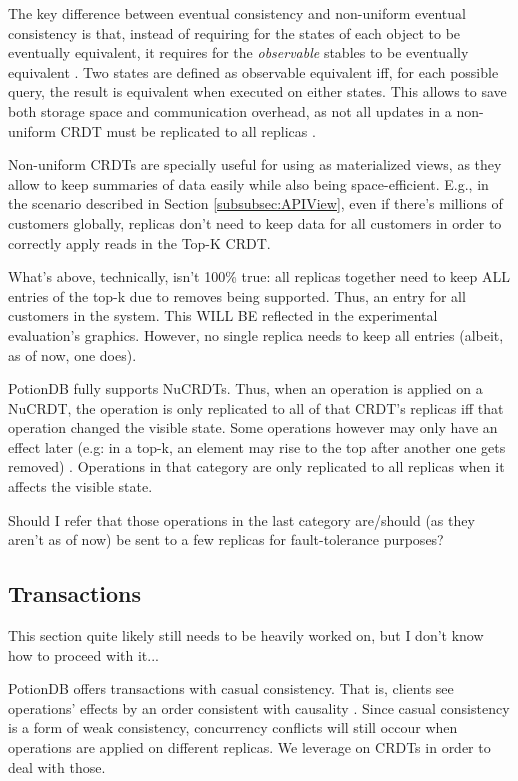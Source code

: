 \documentclass{vldb}
\newcommand{\grumbler}[2]{{\color{red}{\bf #1:} #2}}
\newcommand{\andre}[1]{\grumbler{andre}{#1}}
\begin{document}
The key difference between eventual consistency and non-uniform eventual consistency is that, instead of requiring for the states of each object to be eventually equivalent, it requires for the \emph{observable} stables to be eventually equivalent \cite{???}.
Two states are defined as observable equivalent iff, for each possible query, the result is equivalent when executed on either states.
This allows to save both storage space and communication overhead, as not all updates in a non-uniform CRDT must be replicated to all replicas \cite{???}.

Non-uniform CRDTs are specially useful for using as materialized views, as they allow to keep summaries of data easily while also being space-efficient.
E.g., in the scenario described in Section \ref{subsubsec:APIView}, even if there's millions of customers globally, replicas don't need to keep data for all customers in order to correctly apply reads in the Top-K CRDT.

\andre{What's above, technically, isn't 100\% true: all replicas together need to keep ALL entries of the top-k due to removes being supported. Thus, an entry for all customers in the system. This WILL BE reflected in the experimental evaluation's graphics. However, no single replica needs to keep all entries (albeit, as of now, one does).}

PotionDB fully supports NuCRDTs.
Thus, when an operation is applied on a NuCRDT, the operation is only replicated to all of that CRDT's replicas iff that operation changed the visible state.
Some operations however may only have an effect later (e.g: in a top-k, an element may rise to the top after another one gets removed) \cite{???}.
Operations in that category are only replicated to all replicas when it affects the visible state.

\andre{Should I refer that those operations in the last category are/should (as they aren't as of now) be sent to a few replicas for fault-tolerance purposes?}

\subsection{Transactions}

\andre{This section quite likely still needs to be heavily worked on, but I don't know how to proceed with it...}

PotionDB offers transactions with casual consistency.
That is, clients see operations' effects by an order consistent with causality \cite{???}.
Since casual consistency is a form of weak consistency, concurrency conflicts will still occour when operations are applied on different replicas.
We leverage on CRDTs in order to deal with those.
\end{document}
